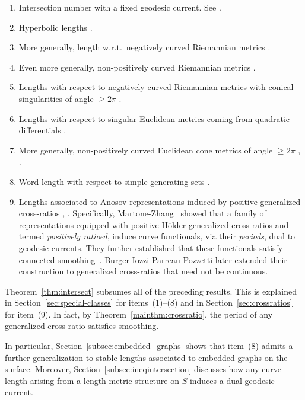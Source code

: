 \documentclass[11pt]{amsart}
\numberwithin{equation}{section}
\numberwithin{figure}{section}
\theoremstyle{definition}
\theoremstyle{plain}
\begin{document}
\begin{enumerate}
   \item Intersection number with a fixed geodesic current. See \cite[Proposition~4.5]{Bonahon86:EndsHyperbolicManifolds}.
    \item Hyperbolic lengths  \cite[Proposition~14]{Bonahon88:GeodesicCurrent}.
    \item More generally, length w.r.t.\ negatively curved Riemannian metrics \cite[Th\'eor\`eme~1]{Otal90:SpectreMarqueNegative}.
    \item Even more generally, non-positively curved Riemannian metrics
\cite[Theorem~A]{CFF92:RigidityNonPosCurvedRiem}.
\item Lengths with respect to negatively curved Riemannian  metrics with conical singularities of angle $\geq 2\pi$ \cite[Theorem~A]{HP97:RigidityNegCurvedCone}.
\item Lengths with respect to singular Euclidean metrics coming from quadratic differentials \cite[Lemma~9]{DLR10:DegenerationFlatMetrics}.
\item More generally, non-positively curved Euclidean cone metrics of angle $\geq 2\pi$ \cite[Proposition~3.3]{BL17:RigidityFlat}, \cite{Con18:MarkedNonpos}.
    \item Word length with respect to simple generating sets \cite[Theorem~1.2]{Erlandsson:WordLength}.
    \item Lengths associated to Anosov representations induced by positive generalized cross-ratios \cite[Proposition~2.24]{MZ19:PositivelyRatioed}, \cite[Theorem~1.6]{BIPP24:PositiveCrossratios}. Specifically, Martone-Zhang~\cite{MZ19:PositivelyRatioed} showed that a family of representations equipped with positive H\"older generalized
cross-ratios and termed \emph{positively ratioed}, induce curve
functionals, via their \emph{periods}, dual to geodesic currents. They further established that
these functionals satisfy connected smoothing~\cite[Proposition~4.5]{MZ19:PositivelyRatioed}.
Burger-Iozzi-Parreau-Pozzetti later extended their construction to generalized cross-ratios that need not be continuous.
\end{enumerate}

Theorem~\ref{thm:intersect} subsumes all of the
preceding results. This is explained in
Section~\ref{sec:special-classes} for items~(1)--(8) and in
Section~\ref{sec:crossratios} for item~(9). In fact, by Theorem~\ref{mainthm:crossratio}, the period of any generalized cross-ratio satisfies smoothing.

In particular, Section~\ref{subsec:embedded_graphs} shows that
item~(8) admits a further generalization to stable lengths associated
to embedded graphs on the surface. Moreover,
Section~\ref{subsec:ineqintersection} discusses how any curve length
arising from a length metric structure on $S$ induces a dual geodesic
current.
\end{document}

